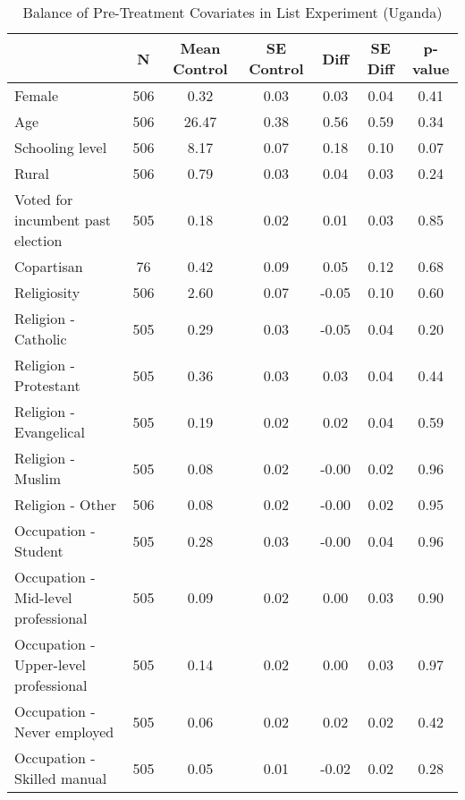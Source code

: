 \begin{table}[htb]
\footnotesize \centering
\caption{Balance of Pre-Treatment Covariates in List Experiment (Uganda)} 
\label{tab:bal_ug}
\begin{tabular}{lcccccc}
  \hline
 & N & Mean Control & SE Control & Diff & SE Diff & p-value \\ 
  \hline
Female & 506 & 0.32 & 0.03 & 0.03 & 0.04 & 0.41 \\ 
  Age & 506 & 26.47 & 0.38 & 0.56 & 0.59 & 0.34 \\ 
  Schooling level & 506 & 8.17 & 0.07 & 0.18 & 0.10 & 0.07 \\ 
  Rural & 506 & 0.79 & 0.03 & 0.04 & 0.03 & 0.24 \\ 
  Voted for incumbent past election & 505 & 0.18 & 0.02 & 0.01 & 0.03 & 0.85 \\ 
  Copartisan & 76 & 0.42 & 0.09 & 0.05 & 0.12 & 0.68 \\ 
  Religiosity & 506 & 2.60 & 0.07 & -0.05 & 0.10 & 0.60 \\ 
  Religion - Catholic & 505 & 0.29 & 0.03 & -0.05 & 0.04 & 0.20 \\ 
  Religion - Protestant & 505 & 0.36 & 0.03 & 0.03 & 0.04 & 0.44 \\ 
  Religion - Evangelical & 505 & 0.19 & 0.02 & 0.02 & 0.04 & 0.59 \\ 
  Religion - Muslim & 505 & 0.08 & 0.02 & -0.00 & 0.02 & 0.96 \\ 
  Religion - Other & 506 & 0.08 & 0.02 & -0.00 & 0.02 & 0.95 \\ 
  Occupation - Student & 505 & 0.28 & 0.03 & -0.00 & 0.04 & 0.96 \\ 
  Occupation - Mid-level professional & 505 & 0.09 & 0.02 & 0.00 & 0.03 & 0.90 \\ 
  Occupation - Upper-level professional & 505 & 0.14 & 0.02 & 0.00 & 0.03 & 0.97 \\ 
  Occupation - Never employed & 505 & 0.06 & 0.02 & 0.02 & 0.02 & 0.42 \\ 
  Occupation - Skilled manual & 505 & 0.05 & 0.01 & -0.02 & 0.02 & 0.28 \\ 
   \hline
\end{tabular}

\end{table}
